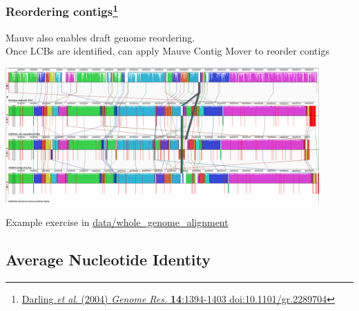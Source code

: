\begin{frame}
  \frametitle{Reordering contigs\footnote{\tiny{\href{http://dx.doi.org/10.1101/gr.2289704}{Darling \textit{et al}. (2004) \textit{Genome Res.} \textbf{14}:1394-1403 doi:10.1101/gr.2289704}}}}
  Mauve also enables draft genome reordering.\\
  Once LCBs are identified, can apply Mauve Contig Mover to reorder contigs
  \begin{center}
    \includegraphics[width=0.9\textwidth]{images/mauve_dickeya}
  \end{center}    
  Example exercise in \url{data/whole_genome_alignment}
\end{frame}

\subsection{Average Nucleotide Identity}

